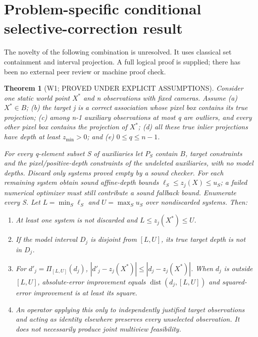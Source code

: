 \documentclass[11pt]{article}
\newtheorem{theorem}{Theorem}
\begin{document}
\section*{Problem-specific conditional selective-correction result}
The novelty of the following combination is unresolved. It uses classical set containment and interval projection. A full logical proof is supplied; there has been no external peer review or machine proof check.

\begin{theorem}[W1; PROVED UNDER EXPLICIT ASSUMPTIONS]
Consider one static world point $X^*$ and n observations with fixed cameras. Assume (a) $X^*\in B$; (b) the target j is a correct association whose pixel box contains its true projection; (c) among n-1 auxiliary observations at most q are outliers, and every other pixel box contains the projection of $X^*$; (d) all these true inlier projections have depth at least $z_{\min}>0$; and (e) $0\le q\le n-1$.

For every q-element subset S of auxiliaries let $P_S$ contain $B$, target constraints and the pixel/positive-depth constraints of the undeleted auxiliaries, with no model depths. Discard only systems proved empty by a sound checker. For each remaining system obtain sound affine-depth bounds $\ell_S\le z_j(X)\le u_S$; a failed numerical optimizer must still contribute a sound fallback bound. Enumerate every S. Let $L=\min_S\ell_S$ and $U=\max_S u_S$ over nondiscarded systems. Then:
\begin{enumerate}
\item At least one system is not discarded and $L\le z_j(X^*)\le U$.
\item If the model interval $D_j$ is disjoint from $[L,U]$, its true target depth is not in $D_j$.
\item For $d'_j=\Pi_{[L,U]}(d_j)$, $|d'_j-z_j(X^*)|\le|d_j-z_j(X^*)|$. When $d_j$ is outside $[L,U]$, absolute-error improvement equals $\operatorname{dist}(d_j,[L,U])$ and squared-error improvement is at least its square.
\item An operator applying this only to independently justified target observations and acting as identity elsewhere preserves every unselected observation. It does not necessarily produce joint multiview feasibility.
\end{enumerate}
\end{theorem}
\end{document}
